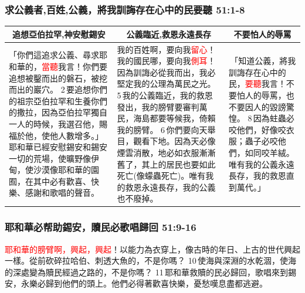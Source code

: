 \subsubsection{求公義者,百姓,公義，將我訓誨存在心中的民要聽 51:1-8}
\begin{table}[H]
\centering
\begin{tabular}{p{5.75cm}|p{6.50cm}|p{4.50cm}}\hline\hline
\multicolumn{1}{c|}{追想亞伯拉罕,神安慰錫安}&\multicolumn{1}{c}{公義臨近,救恩永遠長存}&\multicolumn{1}{c}{不要怕人的辱罵}\\\hline
「你們這追求公義、尋求耶和華的，\textcolor{red}{當聽}我言！你們要追想被鑿而出的磐石，被挖而出的巖穴。 2 要追想你們的祖宗亞伯拉罕和生養你們的撒拉，因為亞伯拉罕獨自一人的時候，我選召他，賜福於他，使他人數增多。」耶和華已經安慰錫安和錫安一切的荒場，使曠野像伊甸，使沙漠像耶和華的園囿，在其中必有歡喜、快樂、感謝和歌唱的聲音。
&我的百姓啊，要向我\textcolor{red}{留心}！我的國民哪，要向我\textcolor{red}{側耳}！因為訓誨必從我而出，我必堅定我的公理為萬民之光。 5 我的公義臨近，我的救恩發出，我的膀臂要審判萬民，海島都要等候我，倚賴我的膀臂。 6 你們要向天舉目，觀看下地。因為天必像煙雲消散，地必如衣服漸漸舊了，其上的居民也要如此死亡(像蠓蟲死亡)。唯有我的救恩永遠長存，我的公義也不廢掉。
& 「知道公義，將我訓誨存在心中的民，\textcolor{red}{要聽}我言！不要怕人的辱罵，也不要因人的毀謗驚惶。 8 因為蛀蟲必咬他們，好像咬衣服；蟲子必咬他們，如同咬羊絨。唯有我的公義永遠長存，我的救恩直到萬代。」\\\hline
\end{tabular}
\end{table}


\subsubsection{耶和華必帮助錫安，贖民必歌唱歸回 51:9-16}
\textcolor{red}{耶和華的膀臂啊，興起，興起}！以能力為衣穿上，像古時的年日、上古的世代興起一樣。從前砍碎拉哈伯、刺透大魚的，不是你嗎？ 10 使海與深淵的水乾涸，使海的深處變為贖民經過之路的，不是你嗎？ 11 耶和華救贖的民必歸回，歌唱來到錫安，永樂必歸到他們的頭上。他們必得著歡喜快樂，憂愁嘆息盡都逃避。

